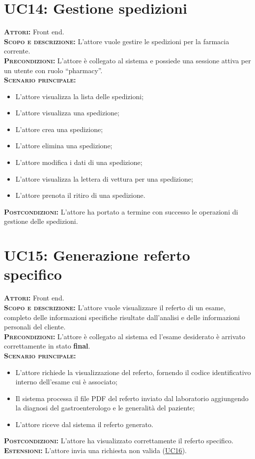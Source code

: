 \section{UC14: Gestione spedizioni}
\label{sec:UC14}
\textsc{\textbf{Attori:}} Front end.\\
\textsc{\textbf{Scopo e descrizione:}} L'attore vuole gestire le spedizioni per la farmacia corrente.\\
\textsc{\textsc{\textbf{Precondizioni:}}} L'attore è collegato al sistema e possiede una sessione attiva per un utente con ruolo ``pharmacy''.\\
\textsc{\textbf{Scenario principale:}}
\begin{itemize}
    \item L'attore visualizza la lista delle spedizioni;
    \item L'attore visualizza una spedizione;
    \item L'attore crea una spedizione;
    \item L'attore elimina una spedizione;
    \item L'attore modifica i dati di una spedizione;
    \item L'attore visualizza la lettera di vettura per una spedizione;
    \item L'attore prenota il ritiro di una spedizione.
\end{itemize}
\textsc{\textbf{Postcondizioni:}} L'attore ha portato a termine con successo le operazioni di gestione delle spedizioni.

\section{UC15: Generazione referto specifico}
\label{sec:UC15}
\textsc{\textbf{Attori:}} Front end.\\
\textsc{\textbf{Scopo e descrizione:}} L'attore vuole visualizzare il referto di un esame, completo delle informazioni specifiche risultate dall'analisi e delle informazioni personali del cliente.\\
\textsc{\textsc{\textbf{Precondizioni:}}} L'attore è collegato al sistema ed l'esame desiderato è arrivato correttamente in stato \textbf{final}.\\
\textsc{\textbf{Scenario principale:}}
\begin{itemize}
    \item L'attore richiede la visualizzazione del referto, fornendo il codice identificativo interno dell'esame cui è associato;
    \item Il sistema processa il file PDF del referto inviato dal laboratorio aggiungendo la diagnosi del gastroenterologo e le generalità del paziente;
    \item L'attore riceve dal sistema il referto generato.
\end{itemize}
\textsc{\textbf{Postcondizioni:}} L'attore ha visualizzato correttamente il referto specifico.\\
\textsc{\textbf{Estensioni:}} L'attore invia una richiesta non valida (\hyperref[sec:UC16]{UC16}).

